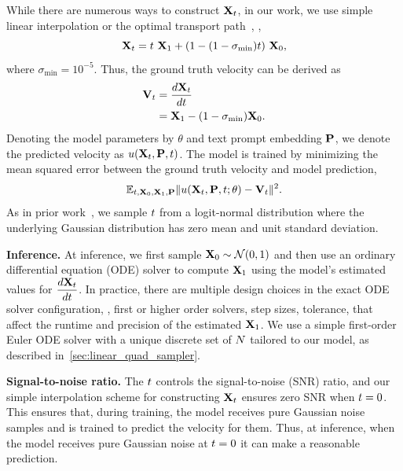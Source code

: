 While there are numerous ways to construct $\mathbf{X}_{t}$, in our work, we use simple linear interpolation or the optimal transport path~\citep{flow-matching}, \ie,
\begin{equation*}
  \mathbf{X}_{t} = t~\mathbf{X}_{1} + (1 - (1-\sigma_{\mathrm{min}})t)~\mathbf{X}_{0},
\end{equation*}
where $\sigma_{\mathrm{min}}=10^{-5}$.
Thus, the ground truth velocity can be derived as
\begin{equation*}
  \begin{split}
    \mathbf{V}_{t} &= \dfrac{d\mathbf{X}_{t}}{dt} \\
    &= \mathbf{X}_{1} - (1-\sigma_{\mathrm{min}}) \mathbf{X}_{0}.
  \end{split}
\end{equation*}
Denoting the model parameters by $\theta$ and text prompt embedding $\mathbf{P}$, we denote the predicted velocity as $u(\mathbf{X}_{t}, \mathbf{P}, t)$.
The model is trained by minimizing the mean squared error between the ground truth velocity and model prediction,
\begin{equation}
  \label{eq:fm}
  \mathbb{E}_{t, \mathbf{X}_0, \mathbf{X}_1, \mathbf{P}}\|u(\mathbf{X}_{t}, \mathbf{P}, t; \theta) - \mathbf{V}_t\|^2.
\end{equation}
As in prior work~\citep{sd3}, we sample $t$ from a logit-normal distribution where the underlying Gaussian distribution has zero mean and unit standard deviation.


\par \noindent \textbf{Inference.}
At inference, we first sample $\mathbf{X}_{0}\sim \mathcal{N}(0, 1)$ and then use an ordinary differential equation (ODE) solver to compute $\mathbf{X}_{1}$ using the model's estimated values for $\dfrac{d\mathbf{X}_{t}}{dt}$.
In practice, there are multiple design choices in the exact ODE solver configuration, \eg, first or higher order solvers, step sizes, tolerance, \etc that affect the runtime and precision of the estimated $\mathbf{X}_{1}$.
We use a simple first-order Euler ODE solver with a unique discrete set of $N$ \timesteps tailored to our model, as described in~\cref{sec:linear_quad_sampler}.



\par \noindent \textbf{Signal-to-noise ratio.}
The \timestep $t$ controls the signal-to-noise (SNR) ratio, and our simple interpolation scheme for constructing $\mathbf{X}_{t}$ ensures zero SNR when $t=0$.
This ensures that, during training, the model receives pure Gaussian noise samples and is trained to predict the velocity for them.
Thus, at inference, when the model receives pure Gaussian noise at $t=0$ it can make a reasonable prediction.

